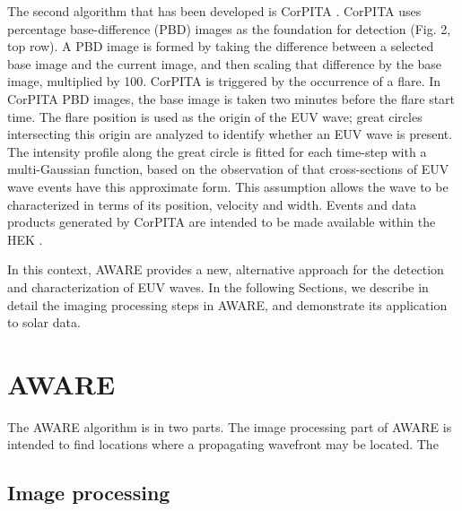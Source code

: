 \documentclass[referee,a4paper,12pt,traditabstract]{swsc}
\begin{document}
\begin{linenumbers}


The second algorithm that has been developed is CorPITA
\citep{2014SoPh..289.3279L}. CorPITA uses percentage base-difference
(PBD) images as the foundation for detection (Fig. 2, top row).  A PBD
image is formed by taking the difference between a selected base image
and the current image, and then scaling that difference by the base
image, multiplied by 100.  CorPITA is triggered by the occurrence of a
flare.  In CorPITA PBD images, the base image is taken two minutes
before the flare start time. The flare position is used as the origin
of the EUV wave; great circles intersecting this origin are analyzed
to identify whether an EUV wave is present. The intensity profile
along the great circle is fitted for each time-step with a
multi-Gaussian function, based on the observation of
\cite{2006ApJ...645..757W} that cross-sections of EUV wave events have
this approximate form. This assumption allows the wave to be
characterized in terms of its position, velocity and width. Events and
data products generated by CorPITA are intended to be made available
within the HEK \citep{hek2012, 2012SoPh..275...79M}.  

In this context, AWARE provides a new, alternative approach for the
detection and characterization of EUV waves.  In the following
Sections, we describe in detail the imaging processing steps in AWARE,
and demonstrate its application to solar data.

\section{AWARE}\label{sec:aware}

The AWARE algorithm is in two parts.  The image processing part of
AWARE is intended to find locations where a propagating wavefront may
be located.  The 


\subsection{Image processing}
\label{img_proc}


\end{linenumbers}
\end{document}
